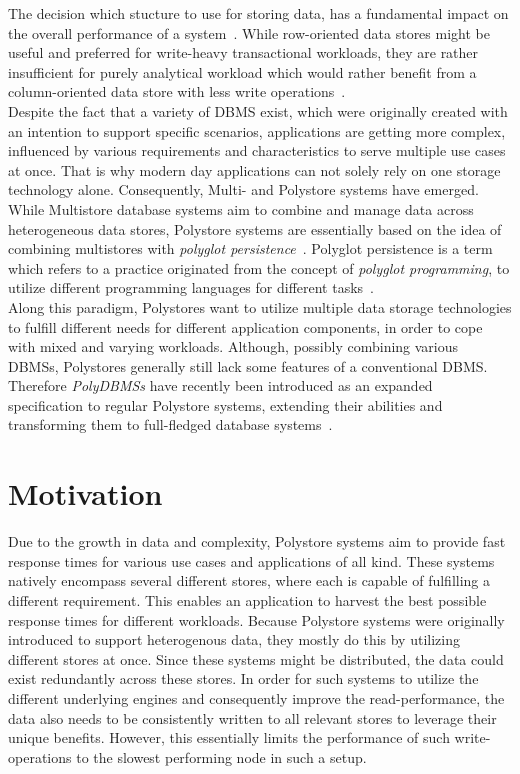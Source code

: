 The decision which stucture to use for storing data, has a fundamental impact on the overall performance of a system~\cite{plattner2015}.
While row-oriented data stores might be useful and preferred for write-heavy transactional 
workloads, they are rather insufficient for purely analytical workload which would rather benefit from a
column-oriented data store with less write operations~\cite{sigmond2008}.\\
Despite the fact that a variety of DBMS exist, which were originally created with an intention to support specific scenarios,
applications are getting more complex, influenced by various requirements and characteristics to serve multiple use cases at once.
That is why modern day applications can not solely rely on one storage technology alone. 
Consequently, Multi- and Polystore systems have emerged.
While Multistore database systems aim to combine and manage data across heterogeneous data stores,
Polystore systems are essentially based on the idea of combining multistores with
\textit{polyglot persistence}~\cite{polypheny2020}.
Polyglot persistence is a term which refers to a practice originated from the concept 
of \textit{polyglot programming}, to utilize different 
programming languages for different tasks~\cite{fowler2011}. \\
Along this paradigm, Polystores want to utilize multiple data storage technologies to
fulfill different needs for different application components, in order to cope
with mixed and varying workloads.
Although, possibly combining various DBMSs, Polystores generally still lack some features of a conventional DBMS.
Therefore \emph{PolyDBMSs} have recently been introduced as an expanded specification to 
regular Polystore systems, extending their abilities and transforming them to full-fledged database systems~\cite{polypheny2021}.


\section{Motivation}

Due to the growth in data and complexity, Polystore systems aim to provide fast response times for various use cases and applications of all kind.
These systems natively encompass several different stores, where each is capable of fulfilling a different requirement. 
This enables an application to harvest the best possible response times for different workloads.
Because Polystore systems were originally introduced to support heterogenous data, they mostly do this by utilizing different stores at once.
Since these systems might be distributed, the data could exist redundantly across these stores. 
In order for such systems to utilize the different underlying engines and consequently improve the read-performance, 
the data also needs to be consistently written to all relevant stores to leverage their unique benefits.
However, this essentially limits the performance of such write-operations to the slowest performing node in such a setup.

